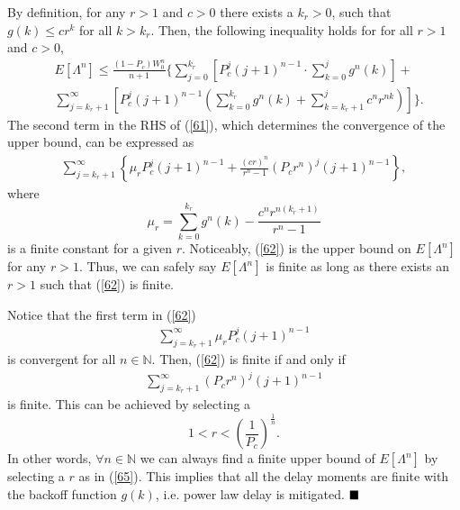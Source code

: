 \documentclass[journal]{IEEEtran}
\begin{document}
By definition, for any $r>1$ and $c>0$ there exists a $k_r>0$, such that $g(k)\leq cr^k$ for all $k>k_r$. Then, the following inequality holds for for all $r>1$ and $c>0$,
\begin{equation}
\label{61}
\begin{aligned}
&E[\Lambda^n]\leq\frac{\left(1-P_c\right)W_0^n}{n+1}\Biggl\{\sum_{j=0}^{k_r}\left[P_c^j\left(j+1\right)^{n-1}\cdot \sum_{k=0}^{j}g^n(k)\right]+ \\
&\sum_{j=k_r+1}^{\infty}\left[P_c^j\left(j+1\right)^{n-1} \left(\sum_{k=0}^{k_r}g^n(k) + \sum_{k=k_r+1}^{j}c^nr^{nk}\right)\right]\Biggr\}.
\end{aligned}
\end{equation}
The second term in the RHS of (\ref{61}), which determines the convergence of the upper bound, can be expressed as
\begin{equation}
\label{62}
\begin{aligned}
\sum_{j=k_r+1}^{\infty}\left\{\mu_r P_c^j\left(j+1\right)^{n-1}+ \frac{\left(cr\right)^n}{r^n-1}\left(P_cr^n\right)^j\left(j+1\right)^{n-1}\right\},
\end{aligned}
\end{equation}
where
\begin{equation}
\mu_r = \sum_{k=0}^{k_r}g^n(k) - \frac{c^nr^{n\left(k_r+1\right)}}{r^n-1}
\end{equation}
is a finite constant for a given $r$. Noticeably, (\ref{62}) is the upper bound on $E\left[\Lambda^n\right]$ for any $r>1$. Thus, we can safely say $E\left[\Lambda^n\right]$ is finite as long as there exists an $r>1$ such that (\ref{62}) is finite.

Notice that the first term in (\ref{62})
\begin{equation}
\begin{aligned}
\sum_{j=k_r+1}^{\infty}\mu_r P_c^j\left(j+1\right)^{n-1}
\end{aligned}
\end{equation}
is convergent for all $n\in \mathbb{N}$. Then, (\ref{62}) is finite if and only if
\begin{equation}
\label{63}
\begin{aligned}
\sum_{j=k_r+1}^{\infty}\left(P_cr^n\right)^j\left(j+1\right)^{n-1}
\end{aligned}
\end{equation}
is finite. This can be achieved by selecting a
\begin{equation}
\label{65}
1<r<\left(\frac{1}{P_c}\right)^{\frac{1}{n}}.
\end{equation}
In other words, $\forall n \in \mathbb{N}$ we can always find a finite upper bound of $E[\Lambda^n]$ by selecting a $r$ as in (\ref{65}). This implies that all the delay moments are finite with the backoff function $g(k)$, i.e. power law delay is mitigated. $\hfill \blacksquare$
\end{document}
